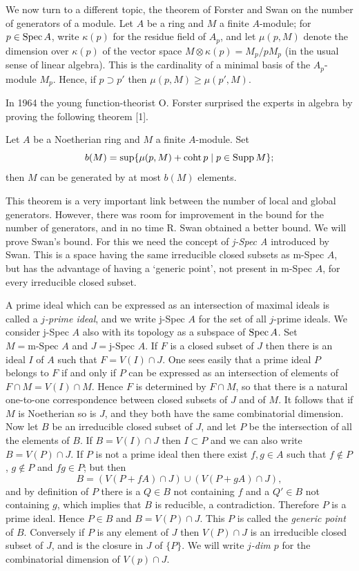 We now turn to a different topic, the theorem of Forster and Swan on the
number of generators of a module. Let $A$ be a ring and $M$ a finite $A$-module;
for $p \in \operatorname{Spec} A$, write $\kappa(p)$ for the residue field of $A_p$, and let $\mu(p, M)$ denote the
dimension over $\kappa(p)$ of the vector space $M \otimes \kappa(p) = M_p/pM_p$ (in the usual
sense of linear algebra). This is the cardinality of a minimal basis of the
$A_p$-module $M_p$. Hence, if $p \supset p'$ then $\mu(p, M) \ge \mu(p', M)$.

In 1964 the young function-theorist O. Forster surprised the experts in
algebra by proving the following theorem [1].

\begin{theorem}\label{thm:5.7}
Let $A$ be a Noetherian ring and $M$ a finite $A$-module. Set
\[
  b(M) = \sup\{\mu(p, M) + \operatorname{coht} p \mid p \in \operatorname{Supp} M\};
\]
then $M$ can be generated by at most $b(M)$ elements.
\end{theorem}

This theorem is a very important link between the number of local and
global generators. However, there was room for improvement in the bound
for the number of generators, and in no time R. Swan obtained a better
bound. We will prove Swan's bound. For this we need the concept of \emph{j-Spec
A} introduced by Swan. This is a space having the same irreducible closed
subsets as m-Spec $A$, but has the advantage of having a `generic point', not
present in m-Spec $A$, for every irreducible closed subset.

A prime ideal which can be expressed as an intersection of maximal
ideals is called a \emph{$j$-prime ideal}, and we write j-Spec $A$ for the set of all
$j$-prime ideals. We consider j-Spec $A$ also with its topology as a subspace
of $\operatorname{Spec} A$. Set $M = \text{m-Spec } A$ and $J = \text{j-Spec } A$. If $F$ is a closed subset of
$J$ then there is an ideal $I$ of $A$ such that $F = V(I) \cap J$. One sees easily that
a prime ideal $P$ belongs to $F$ if and only if $P$ can be expressed as an
intersection of elements of $F \cap M = V(I) \cap M$. Hence $F$ is determined by
$F \cap M$, so that there is a natural one-to-one correspondence between
closed subsets of $J$ and of $M$. It follows that if $M$ is Noetherian so is $J$,
and they both have the same combinatorial dimension. Now let $B$ be an
irreducible closed subset of $J$, and let $P$ be the intersection of all the
elements of $B$. If $B = V(I) \cap J$ then $I \subset P$ and we can also write
$B = V(P) \cap J$. If $P$ is not a prime ideal then there exist $f, g \in A$ such that
$f \notin P$, $g \notin P$ and $fg \in P$; but then
\[
  B = (V(P + fA) \cap J) \cup (V(P + gA) \cap J),
\]
and by definition of $P$ there is a $Q \in B$ not containing $f$ and a $Q' \in B$ not
containing $g$, which implies that $B$ is reducible, a contradiction. Therefore
$P$ is a prime ideal. Hence $P \in B$ and $B = V(P) \cap J$. This $P$ is called the
\emph{generic point} of $B$. Conversely if $P$ is any element of $J$ then $V(P) \cap J$ is
an irreducible closed subset of $J$, and is the closure in $J$ of $\{P\}$. We will
write \emph{$j$-dim $p$} for the combinatorial dimension of $V(p) \cap J$.

